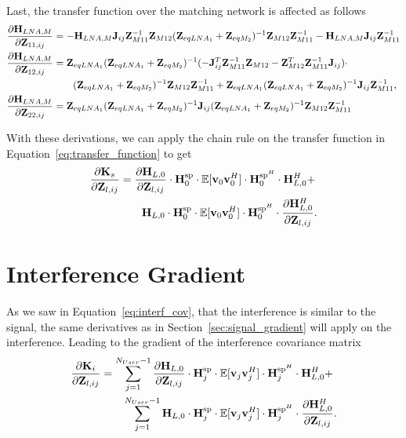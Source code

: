 Last, the transfer function over the matching network is affected as follows
\begin{align}
\label{eq:HLNAM_sig_grad}
\frac{\partial\mathbf{H}_{LNA,M}}{\partial\mathbf{Z}_{11,ij}}&=
-\mathbf{H}_{LNA,M}\mathbf{J}_{ij}\mathbf{Z}_{M11}^{-1}\mathbf{Z}_{M12}(\mathbf{Z}_{eqLNA_1} + \mathbf{Z}_{eqM_2})^{-1}\mathbf{Z}_{M12}\mathbf{Z}_{M11}^{-1}-\mathbf{H}_{LNA,M}\mathbf{J}_{ij}\mathbf{Z}_{M11}^{-1}\\\nonumber
\frac{\partial\mathbf{H}_{LNA,M}}{\partial\mathbf{Z}_{12,ij}}&=
\mathbf{Z}_{eqLNA_1}(\mathbf{Z}_{eqLNA_1} + \mathbf{Z}_{eqM_2})^{-1}(-\mathbf{J}_{ij}^T\mathbf{Z}_{M11}^{-1}\mathbf{Z}_{M12} - \mathbf{Z}_{M12}^T\mathbf{Z}_{M11}^{-1}\mathbf{J}_{ij})\cdot\\
&\qquad(\mathbf{Z}_{eqLNA_1} + \mathbf{Z}_{eqM_2})^{-1}\mathbf{Z}_{M12}\mathbf{Z}_{M11}^{-1} + \mathbf{Z}_{eqLNA_1}(\mathbf{Z}_{eqLNA_1} + \mathbf{Z}_{eqM_2})^{-1}\mathbf{J}_{ij}\mathbf{Z}_{M11}^{-1},\\
\frac{\partial\mathbf{H}_{LNA,M}}{\partial\mathbf{Z}_{22,ij}}&=
\mathbf{Z}_{eqLNA_1}(\mathbf{Z}_{eqLNA_1} + \mathbf{Z}_{eqM_2})^{-1}\mathbf{J}_{ij}(\mathbf{Z}_{eqLNA_1} + \mathbf{Z}_{eqM_2})^{-1}\mathbf{Z}_{M12}\mathbf{Z}_{M11}^{-1}
\label{eq:HLNAM_sig_grad_22}
\end{align}

With these derivations, we can apply the chain rule on the transfer function in Equation~\eqref{eq:transfer_function} to get 
\begin{align}
\label{eq:signal_gradient}
\frac{\partial\mathbf{K}_s}{\partial\mathbf{Z}_{l,ij}} &= \frac{\partial\mathbf{H}_{L,0}}{\partial\mathbf{Z}_{l,ij}}\cdot \mathbf{H}_{0}^{\text{sp}}
	\cdot\mathbb{E}[\mathbf{v}_0\mathbf{v}_0^H]\cdot
	\mathbf{H}_{0}^{\text{sp}^H} \cdot \mathbf{H}_{L,0}^H + \\\nonumber
&\qquad	\mathbf{H}_{L,0}\cdot \mathbf{H}_{0}^{\text{sp}}
	\cdot\mathbb{E}[\mathbf{v}_0\mathbf{v}_0^H]\cdot
	\mathbf{H}_{0}^{\text{sp}^H} \cdot \frac{\partial\mathbf{H}_{L,0}^H }{\partial\mathbf{Z}_{l,ij}}.
\end{align}

\section{Interference Gradient}
\label{sec:interf_gradient}

As we saw in Equation~\eqref{eq:interf_cov}, that the interference is similar to the signal, the same derivatives as in Section~\ref{sec:signal_gradient} will apply on the interference.
Leading to the gradient of the interference covariance matrix
\begin{align}
\label{eq:interf_gradient}
\frac{\partial\mathbf{K}_i}{\partial\mathbf{Z}_{l,ij}} &= \sum_{j=1}^{N_{User}-1} 
	\frac{\partial\mathbf{H}_{L,0}}{\partial\mathbf{Z}_{l,ij}} \cdot \mathbf{H}_{j}^{\text{sp}} \cdot 
	\mathbb{E}[\mathbf{v}_{j}\mathbf{v}_{j}^H] \cdot 
	\mathbf{H}_{j}^{\text{sp}^H} \cdot \mathbf{H}_{L,0}^H + \\\nonumber
 &\qquad \sum_{j=1}^{N_{User}-1} 
	\mathbf{H}_{L,0} \cdot \mathbf{H}_{j}^{\text{sp}} \cdot 
	\mathbb{E}[\mathbf{v}_{j}\mathbf{v}_{j}^H] \cdot 
	\mathbf{H}_{j}^{\text{sp}^H} \cdot \frac{\partial\mathbf{H}_{L,0}^H}{\partial\mathbf{Z}_{l,ij}}.
\end{align}

